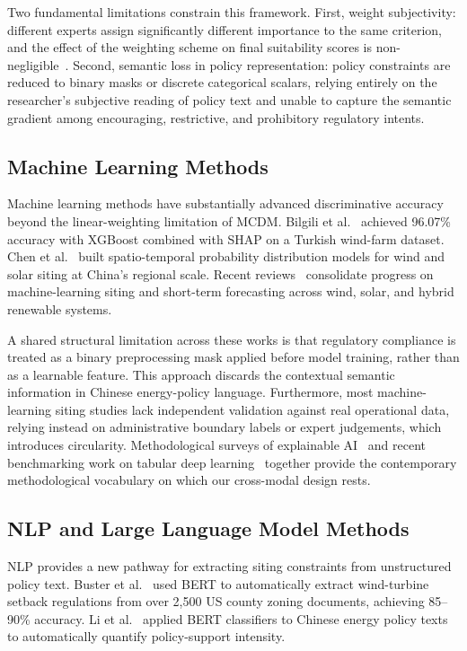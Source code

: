 \documentclass[12pt, a4paper]{article}
\begin{document}
Two fundamental limitations constrain this framework. First,
weight subjectivity: different experts assign significantly
different importance to the same criterion, and the effect of
the weighting scheme on final suitability scores is
non-negligible~\cite{wu2022,xu2020}. Second, semantic loss in
policy representation: policy constraints are reduced to binary
masks or discrete categorical scalars, relying entirely on the
researcher's subjective reading of policy text and unable to
capture the semantic gradient among encouraging, restrictive,
and prohibitory regulatory intents.

\subsection{Machine Learning Methods}

Machine learning methods have substantially advanced
discriminative accuracy beyond the linear-weighting limitation
of MCDM. Bilgili et al.~\cite{bilgili2024xai} achieved 96.07\%
accuracy with XGBoost combined with SHAP on a Turkish wind-farm
dataset. Chen et al.~\cite{chen2026} built spatio-temporal
probability distribution models for wind and solar siting at
China's regional scale. Recent reviews~\cite{jurasz2025}
consolidate progress on machine-learning siting and
short-term forecasting across wind, solar, and hybrid
renewable systems.

A shared structural limitation across these works is that
regulatory compliance is treated as a binary preprocessing
mask applied before model training, rather than as a learnable
feature. This approach discards the contextual semantic
information in Chinese energy-policy language. Furthermore,
most machine-learning siting studies lack independent
validation against real operational data, relying instead on
administrative boundary labels or expert judgements, which
introduces circularity. Methodological surveys of explainable
AI~\cite{samek2021} and recent benchmarking work on tabular
deep learning~\cite{shwartz2022,borisov2024} together provide
the contemporary methodological vocabulary on which our
cross-modal design rests.

\subsection{NLP and Large Language Model Methods}

NLP provides a new pathway for extracting siting constraints
from unstructured policy text. Buster et al.~\cite{buster2024}
used BERT to automatically extract wind-turbine setback
regulations from over 2,500 US county zoning documents,
achieving 85--90\% accuracy. Li et al.~\cite{li2023} applied
BERT classifiers to Chinese energy policy texts to
automatically quantify policy-support intensity.
\end{document}
